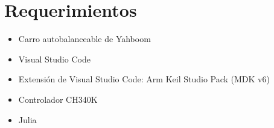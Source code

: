 \section{Requerimientos}

\begin{itemize}
    \item Carro autobalanceable de Yahboom
    \item Visual Studio Code
    \item Extensión de Visual Studio Code: Arm Keil Studio Pack (MDK v6)
    \item Controlador CH340K
    \item Julia
\end{itemize}